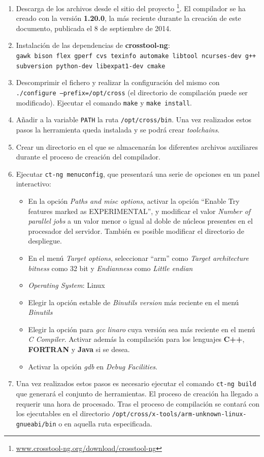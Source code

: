\documentclass{article}
\begin{document}
\begin{enumerate}
	\item Descarga de los archivos desde el sitio del proyecto \footnote{\href{www.crosstool-ng.org/download/crosstool-ng}{www.crosstool-ng.org/download/crosstool-ng}}. El compilador se ha creado con la versión \textbf{1.20.0}, la más reciente durante la creación de este documento, publicada el 8 de septiembre de 2014.
	\item Instalación de las dependencias de \textbf{crosstool-ng}:\\
		\texttt{gawk bison flex gperf cvs texinfo automake libtool ncurses-dev g++ subversion python-dev libexpat1-dev cmake}
	\item Descomprimir el fichero y realizar la configuración del mismo con \texttt{./configure --prefix=/opt/cross} (el directorio de compilación puede ser modificado). Ejecutar el comando \texttt{make} y \texttt{make install}.
	\item Añadir a la variable \texttt{PATH} la ruta \texttt{/opt/cross/bin}.
	Una vez realizados estos pasos la herramienta queda instalada y se podrá crear \textit{toolchains}.
	\item Crear un directorio en el que se almacenarán los diferentes archivos auxiliares durante el proceso de creación del compilador.
	\item Ejecutar \texttt{ct-ng menuconfig}, que presentará una serie de opciones en un panel interactivo:

	\begin{itemize}
		\item En la opción \textit{Paths and misc options}, activar la opción ``Enable Try features marked as EXPERIMENTAL'', y modificar el valor \textit{Number of parallel jobs} a un valor menor o igual al doble de núcleos presentes en el procesador del servidor. También es posible modificar el directorio de despliegue.
		\item En el menú \textit{Target options}, seleccionar ``arm'' como \textit{Target architecture} \textit{bitness} como 32 bit y \textit{Endianness} como \textit{Little endian}
		\item \textit{Operating System}: Linux
		\item Elegir la opción estable de \textit{Binutils version} más reciente en el menú \textit{Binutils}
		\item Elegir la opción para \textit{gcc} \textit{linaro} cuya versión sea más reciente en el menú \textit{C Compiler}. Activar además la compilación para los lenguajes \textbf{C++}, \textbf{FORTRAN} y \textbf{Java} si se desea.
		\item Activar la opción \textit{gdb} en \textit{Debug Facilities}.
	\end{itemize}
	\item Una vez realizados estos pasos es necesario ejecutar el comando \texttt{ct-ng build} que generará el conjunto de herramientas. El proceso de creación ha llegado a requerir una hora de procesado. Tras el proceso de compilación se contará con los ejecutables en el directorio \texttt{/opt/cross/x-tools/arm-unknown-linux-gnueabi/bin} o en aquella ruta especificada.

\end{enumerate}
\end{document}
